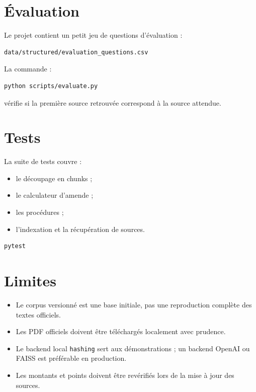\documentclass[12pt,a4paper]{article}
\begin{document}
\section{Évaluation}

Le projet contient un petit jeu de questions d'évaluation :

\begin{lstlisting}
data/structured/evaluation_questions.csv
\end{lstlisting}

La commande :

\begin{lstlisting}[language=bash]
python scripts/evaluate.py
\end{lstlisting}

vérifie si la première source retrouvée correspond à la source attendue.

\section{Tests}

La suite de tests couvre :

\begin{itemize}[leftmargin=1.2cm]
    \item le découpage en chunks ;
    \item le calculateur d'amende ;
    \item les procédures ;
    \item l'indexation et la récupération de sources.
\end{itemize}

\begin{lstlisting}[language=bash]
pytest
\end{lstlisting}

\section{Limites}

\begin{itemize}[leftmargin=1.2cm]
    \item Le corpus versionné est une base initiale, pas une reproduction complète des textes officiels.
    \item Les PDF officiels doivent être téléchargés localement avec prudence.
    \item Le backend local \texttt{hashing} sert aux démonstrations ; un backend OpenAI ou FAISS est préférable en production.
    \item Les montants et points doivent être revérifiés lors de la mise à jour des sources.
\end{itemize}
\end{document}
